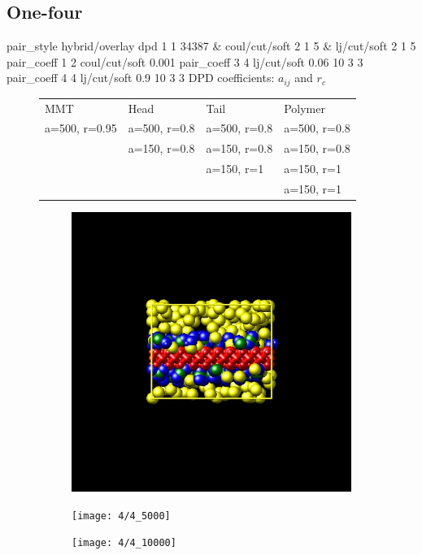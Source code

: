 \documentclass[a4paper]{article}
\begin{document}
\subsection*{One-four}
pair\_style hybrid/overlay dpd 1 1 34387 \& coul/cut/soft 2 1 5 \& 
lj/cut/soft 2 1 5\newline
pair\_coeff 1 2 coul/cut/soft 0.001\newline
pair\_coeff 3 4 lj/cut/soft 0.06    10 3 3\newline
pair\_coeff 4 4 lj/cut/soft 0.9     10 3 3\newline
DPD coefficients: $a_{ij}$ and $r_c$
\begin{figure}[H]\begin{tabular}{llll}
MMT           & Head         & Tail         & Polymer      \\
a=500, r=0.95 & a=500, r=0.8 & a=500, r=0.8 & a=500, r=0.8 \\
              & a=150, r=0.8 & a=150, r=0.8 & a=150, r=0.8 \\
              &              & a=150, r=1   & a=150, r=1   \\
              &              &              & a=150, r=1   \\
\end{tabular}\end{figure}

\begin{figure}[H]
\begin{subfigure}{0.3\textwidth}
  \centering
  \includegraphics[width=\linewidth,keepaspectratio]{start}
  \caption{}
\end{subfigure}
\begin{subfigure}{0.3\textwidth}
  \centering
  \texttt{[image: 4/4\_5000]}
  \caption{}
\end{subfigure}
\begin{subfigure}{0.3\textwidth}
  \centering
  \texttt{[image: 4/4\_10000]}
  \caption{}
\end{subfigure}
\caption{}
\label{fig_1}
\end{figure}
\end{document}
